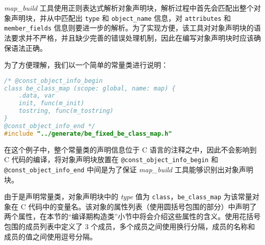 \textsl{map\_build} 工具使用正则表达式解析对象声明块，解析过程中首先会匹配出整个对象声明块，并从中匹配出 \texttt{type} 和 \texttt{object\_name} 信息，对 \texttt{attributes} 和 \texttt{member\_fields} 信息则要进一步的解析。为了实现方便，该工具对对象声明块的语法要求并不严格，并且缺少完善的错误处理机制，因此在编写对象声明块时应该确保语法正确。

为了方便理解，我们以一个简单的常量类进行说明：
\begin{lstlisting}[language=c]
/* @const_object_info_begin
class be_class_map (scope: global, name: map) {
    .data, var
    init, func(m_init)
    tostring, func(m_tostring)
}
@const_object_info_end */
#include "../generate/be_fixed_be_class_map.h"
\end{lstlisting}
在这个例子中，整个常量类的声明信息位于 C 语言的注释之中，因此不会影响到 C 代码的编译，将对象声明块放置在 \texttt{@const\_object\_info\_begin} 和 \texttt{@const\_object\_info\_end} 中间是为了保证 \textsl{map\_build} 工具能够识别出对象声明块。

由于是声明常量类，对象声明块中的 \textsl{type} 值为 \texttt{class}，\texttt{be\_class\_map} 为该常量对象在 C 代码中的变量名。该对象的属性列表（使用圆括号包围的部分）中声明了两个属性，在本节的“编译期构造类”小节中将会介绍这些属性的含义。使用花括号包围的成员列表中定义了 3 个成员，多个成员之间使用换行分隔，成员的名称和成员的值之间使用逗号分隔。

